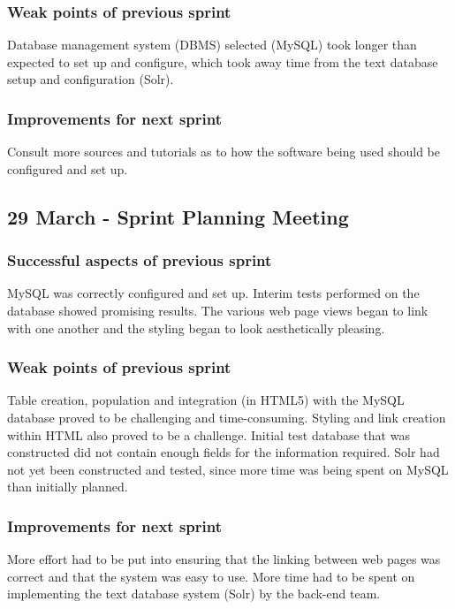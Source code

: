 \documentclass[journal,comsoc,onecolumn]{IEEEtran}
\begin{document}
\subsubsection{Weak points of previous sprint}
\hfill \break Database management system (DBMS) selected (MySQL) took longer than expected to set up and configure, which took away time from the text database setup and configuration (Solr).

\subsubsection{Improvements for next sprint}
\hfill \break Consult more sources and tutorials as to how the software being used should be configured and set up.


\subsection{29 March - Sprint Planning Meeting}

\subsubsection{Successful aspects of previous sprint}
\hfill \break MySQL was correctly configured and set up.
Interim tests performed on the database showed promising results.
The various web page views began to link with one another and the styling began to look aesthetically pleasing.

\subsubsection{Weak points of previous sprint}
\hfill \break Table creation, population and integration (in HTML5) with the MySQL database proved to be challenging and time-consuming. Styling and link creation within HTML also proved to be a challenge.
Initial test database that was constructed did not contain enough fields for the information required.
\break Solr had not yet been constructed and tested, since more time was being spent on MySQL than initially planned.

\subsubsection{Improvements for next sprint}
\hfill \break More effort had to be put into ensuring that the linking between web pages was correct and that the system was easy to use.
More time had to be spent on implementing the text database system (Solr) by the back-end team.
\end{document}

